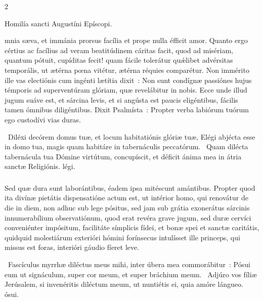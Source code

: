 \documentclass[9pt,twoside]{extarticle}
\begin{document}
\begin{multicols}{2}
{{{\begin{center}Homilía sancti Augustíni Epíscopi.\\
\end{center}
mnia sæva, et immánia prorsus facília et prope nulla éfficit amor. Quanto ergo cértius ac facílius ad veram beatitúdinem cáritas facit, quod ad misériam, quantum pótuit, cupíditas fecit! quam fácile tolerátur quǽlibet advérsitas temporális, ut ætérna pœna vitétur, ætérna réquies comparétur. Non immérito ille vas electiónis cum ingénti lætítia dixit~: Non sunt condígnæ passiónes hujus témporis ad superventúram glóriam, quæ revelábitur in nobis. Ecce unde illud jugum suáve est, et sárcina levis, et si angústa est paucis eligéntibus, fácilis tamen ómnibus diligéntibus. Dixit Psalmísta~: Propter verba labiórum tuórum ego custodívi vias duras.

\begin{tightlist}{}
\item {}~Diléxi decórem domus tuæ, et locum habitatiónis glóriæ tuæ, \textred{*} Elégi abjécta esse in domo tua, magis quam habitáre in tabernáculis peccatórum. ~Quam dilécta tabernácula tua Dómine virtútum, concupíscit, et déficit ánima mea in átria sanctæ Religiónis. légi.
\end{tightlist}

\subsubsection*{\center {}}
Sed quæ dura sunt laborántibus, éadem ipsa mitéscunt amántibus. Propter quod ita divínæ pietátis dispensatióne actum est, ut intérior homo, qui renovátur de die in diem, non adhuc sub lege pósitus, sed jam sub grátia exonerátus sárcinis innumerabílium observatiónum, quod erat revéra grave jugum, sed duræ cervíci conveniénter impósitum, facilitáte símplicis fídei, et bonæ spei et sanctæ caritátis, quidquid molestiárum exterióri hómini forínsecus intulísset ille princeps, qui missus est foras, interióri gáudio fíeret leve.

\begin{tightlist}{}
\item {}~Fascículus myrrhæ diléctus meus mihi, inter úbera mea commorábitur~: \textred{*} Pósui eum ut signáculum, super cor meum, et super bráchium meum. ~Adjúro vos fíliæ Jerúsalem, si invenéritis diléctum meum, ut nuntiétis ei, quia amóre lángueo. ósui.
\end{tightlist}

}}}
\end{multicols}
\end{document}
